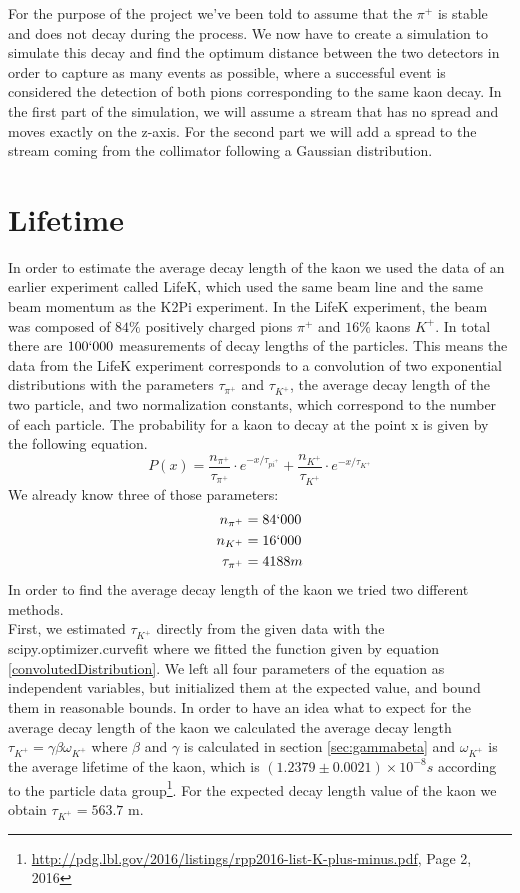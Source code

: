 \documentclass[a4paper,parskip,11pt, DIV12]{scrreprt}
\begin{document}
For the purpose of the project we've been told to assume that the $\pi^+$ is stable and does not decay during the process. We now have to create a simulation to simulate this decay and find the optimum distance between the two detectors in order to capture as many events as possible, where a successful event is considered the detection of both pions corresponding to the same kaon decay. In the first part of the simulation, we will assume a stream that has no spread and moves exactly on the z-axis. For the second part we will add a spread to the stream coming from the collimator following a Gaussian distribution.

\clearpage

\chapter{Lifetime}

In order to estimate the average decay length of the kaon we used the data of an earlier experiment called LifeK, which used the same beam line and the same beam momentum as the K2Pi experiment. In the LifeK experiment, the beam was composed of $84\%$ positively charged pions $\pi^+$ and $16\%$ kaons $K^+$. In total there are $100`000$ measurements of decay lengths of the particles. This means the data from the LifeK experiment corresponds to a convolution of two exponential distributions with the parameters $\tau_{\pi^+}$ and $\tau_{K^+}$, the average decay length of the two particle, and two normalization constants, which correspond to the number of each particle. The probability for a kaon to decay at the point x is given by the following equation.
\begin{equation}
\label{convolutedDistribution}
P(x)=  \frac{n_{\pi^+}}{\tau_{\pi^+}} \cdot e^{-x/ \tau_{pi^+}} + \frac{n_{K^+}}{\tau_{K^+}} \cdot e^{-x/ \tau_{K^+}}
\end{equation} 
We already know three of those parameters:
\begin{align*}
n_{\pi^+} &= 84`000 \\
n_{K^+} &= 16`000 \\
\tau_{\pi^+} &= 4188 m
\end{align*}
In order to find the average decay length of the kaon we tried two different methods.\\
First, we estimated $\tau_{K^+}$ directly from the given data with the scipy.optimizer.curvefit where we fitted the function given by equation \ref{convolutedDistribution}. We left all four parameters of the equation as independent variables, but initialized them at the expected value, and bound them in reasonable bounds. In order to have an idea what to expect for the average decay length of the kaon we calculated the average decay length $\tau_{K^+}= \gamma \beta \omega_{K^+}$ where $\beta$ and $\gamma$ is calculated in section \ref{sec:gammabeta} and $\omega_{K^+}$ is the average lifetime of the kaon, which is $(1.2379 \pm 0.0021) \times 10^{-8} s $ according to the particle data group\footnote{\url{http://pdg.lbl.gov/2016/listings/rpp2016-list-K-plus-minus.pdf}, Page 2, 2016}. For the expected decay length value of the kaon we obtain $\tau_{K^+} = 563.7$ m.
\end{document}
